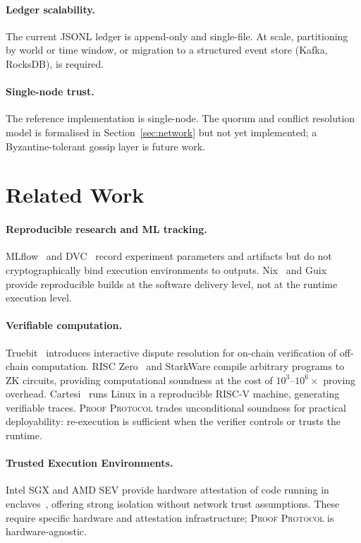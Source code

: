 \documentclass[11pt]{article}
\begin{document}
\paragraph{Ledger scalability.}
The current JSONL ledger is append-only and single-file.  At scale,
partitioning by world or time window, or migration to a structured event
store (Kafka, RocksDB), is required.

\paragraph{Single-node trust.}
The reference implementation is single-node.  The quorum and conflict
resolution model is formalised in Section~\ref{sec:network} but not yet
implemented; a Byzantine-tolerant gossip layer is future work.

\section{Related Work}
\label{sec:related}

\paragraph{Reproducible research and ML tracking.}
MLflow~\citep{mlflow} and DVC~\citep{dvc} record experiment parameters and
artifacts but do not cryptographically bind execution environments to
outputs.  Nix~\citep{nix} and Guix provide reproducible builds at the
software delivery level, not at the runtime execution level.

\paragraph{Verifiable computation.}
Truebit~\citep{truebit} introduces interactive dispute resolution for
on-chain verification of off-chain computation.  RISC Zero~\citep{risczero}
and StarkWare compile arbitrary programs to ZK circuits, providing
computational soundness at the cost of $10^3$--$10^6\times$ proving
overhead.  Cartesi~\citep{cartesi} runs Linux in a reproducible RISC-V
machine, generating verifiable traces.  \textsc{Proof Protocol} trades
unconditional soundness for practical deployability: re-execution is
sufficient when the verifier controls or trusts the runtime.

\paragraph{Trusted Execution Environments.}
Intel SGX and AMD SEV provide hardware attestation of code running in
enclaves~\citep{sgx}, offering strong isolation without network trust
assumptions.  These require specific hardware and attestation
infrastructure; \textsc{Proof Protocol} is hardware-agnostic.
\end{document}
